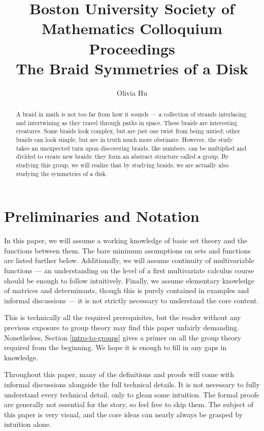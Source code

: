 \documentclass{amsart}
\author{Olivia Hu}
\title[The Braid Symmetries of a Disk]%
{Boston University Society of Mathematics Colloquium Proceedings \\The Braid Symmetries of a Disk}
\begin{document}
\begin{abstract}
	A braid in math is not too far from how it sounds --- a
	collection of strands interlacing and intertwining as they travel through
	paths in space. These braids are interesting creatures.
	Some braids look complex, but are just one twist from being untied; other
	braids can look simple, but are in truth much more obstinate.
	However, the study takes an unexpected turn upon discovering braids, like
	numbers, can be multiplied and divided to create new braids: they
	form an abstract structure called a group. By studying this group, we will
	realize that by studying braids, we are actually also studying the
	symmetries of a disk.
\end{abstract}


\maketitle




\section{Preliminaries and Notation}
In this paper, we will assume a working knowledge of basic set theory and the
functions between them. The bare minimum assumptions on sets and functions are
listed further below. Additionally, we will assume continuity of multivariable
functions --- an understanding on the level of a first multivariate calculus
course should be enough to follow intuitively. Finally, we assume
elementary knowledge of matrices and determinants, though this is purely
contained in examples and informal discussions --- it is not strictly necessary
to understand the core content.

This is technically all the required prerequisites, but the reader without
any previous exposure to group theory may find this paper unfairly demanding.
Nonetheless, Section \ref{intro-to-groups} gives a primer on all the group
theory required from the beginning. We hope it is enough to fill in any gaps in
knowledge.

Throughout this paper, many of the definitions and proofs will come
with informal discussions alongside the full technical details. It is not
necessary to fully understand every technical detail, only to glean some
intuition. The formal proofs are generally not essential for the story, so feel
free to skip them. The
subject of this paper is
very visual, and the core ideas can nearly always be grasped by intuition alone.
\end{document}
